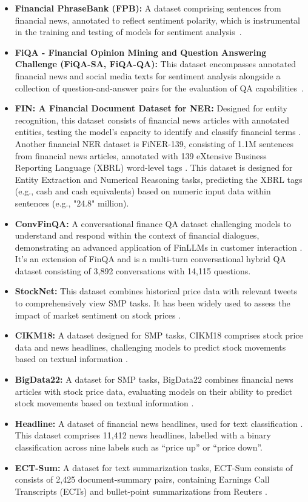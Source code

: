 \begin{itemize}
	\item \textbf{Financial PhraseBank (FPB):} A dataset comprising sentences from financial news, annotated to reflect sentiment polarity, which is instrumental in the training and testing of models for sentiment analysis~\cite{malo2014good}.
	\item \textbf{FiQA - Financial Opinion Mining and Question Answering Challenge (FiQA-SA, FiQA-QA):} This dataset encompasses annotated financial news and social media texts for sentiment analysis alongside a collection of question-and-answer pairs for the evaluation of QA capabilities~\cite{maia2018www}.
	\item \textbf{FIN: A Financial Document Dataset for NER:} {Designed for entity recognition, this dataset consists of financial news articles with annotated entities, testing the model's capacity to identify and classify financial terms \textcite{alvarado2015domain}.
		      Another financial NER dataset is FiNER-139, consisting of 1.1M sentences from financial news articles, annotated with 139 eXtensive Business Reporting Language (XBRL) word-level tags \cite{loukas2022finer}. This dataset is designed for Entity Extraction and Numerical Reasoning tasks, predicting the XBRL tags (e.g., cash and cash equivalents) based on numeric input data within sentences (e.g., "24.8" million).}
	\item \textbf{ConvFinQA:} {A conversational finance QA dataset challenging models to understand and respond within the context of financial dialogues, demonstrating an advanced application of FinLLMs in customer interaction \textcite{chen2022convfinqa}. It's an extension of FinQA and is a multi-turn conversational hybrid QA dataset consisting of 3,892 conversations with 14,115 questions.}
	\item \textbf{StockNet:} {This dataset combines historical price data with relevant tweets to comprehensively view SMP tasks. It has been widely used to assess the impact of market sentiment on stock prices \cite{xu2018stock}.}
	\item \textbf{CIKM18:} {A dataset designed for SMP tasks, CIKM18 comprises stock price data and news headlines, challenging models to predict stock movements based on textual information \cite{wu2018hybrid}.}
	\item \textbf{BigData22:} {A dataset for SMP tasks, BigData22 combines financial news articles with stock price data, evaluating models on their ability to predict stock movements based on textual information \textcite{soun2022accurate}.}
	\item \textbf{Headline:} {A dataset of financial news headlines, used for text classification \cite{sinha2021impact}. This dataset comprises 11,412 news headlines, labelled with a binary classification across nine labels such as “price up” or “price down”.}
	\item \textbf{ECT-Sum:} {A dataset for text summarization tasks, ECT-Sum consists of consists of 2,425 document-summary pairs, containing Earnings Call Transcripts (ECTs) and bullet-point summarizations from Reuters \cite{mukherjee2022ectsum}.}
\end{itemize}

